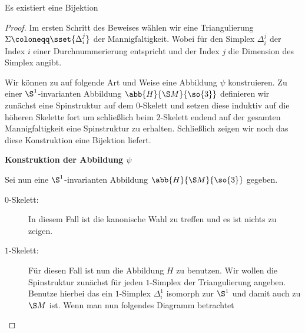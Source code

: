 


\begin{Satz}
	Es existiert eine Bijektion
	\begin{center}
	\end{center}
\begin{proof}
	Im ersten Schritt des Beweises wählen wir eine Triangulierung $\Sigma \coloneqq \sset{ \Delta_i^j}$ der Mannigfaltigkeit. Wobei für den Simplex $\Delta_i^j$ der Index $i$  
	einer Durchnummerierung entspricht und der Index $j$ die Dimension des Simplex angibt.
	
	Wir können zu auf folgende Art und Weise eine Abbildung $\psi$ konstruieren.
	Zu einer $\S^1$-invarianten Abbildung $\abb{H}{\S M}{\so{3}}$ definieren wir
	zunächst eine Spinstruktur auf dem $0$-Skelett und setzen diese induktiv
	auf die höheren Skelette fort um schließlich beim $2$-Skelett endend auf
	der gesamten Mannigfaltigkeit eine Spinstruktur zu erhalten. Schließlich
	zeigen wir noch das diese Konstruktion eine Bijektion liefert.
	
	\textbf{Konstruktion der Abbildung $\psi$}
	
	Sei nun eine $\S^1$-invarianten Abbildung $\abb{H}{\S M}{\so{3}}$ gegeben.
	\begin{description}
		\item[$0$-Skelett:] In diesem Fall ist die kanonische Wahl zu treffen und es
			ist nichts zu zeigen.
		\item[$1$-Skelett:] Für diesen Fall ist nun die Abbildung $H$ zu benutzen. Wir wollen die Spinstruktur zunächst
		für jeden $1$-Simplex der Triangulierung angeben. 
		Benutze hierbei das ein $1$-Simplex $\Delta^1_i$ isomorph
		zur $\S^1$ und damit auch zu $\S M$ ist. Wenn man nun
		folgendes Diagramm betrachtet
		

\end{description}
\end{proof}
\end{Satz}

